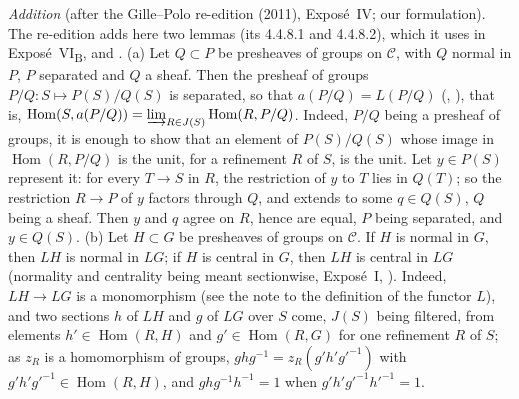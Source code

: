 \par\medskip\noindent
{}\emph{Addition} (after the Gille--Polo re-edition (2011), Expos\'e~IV;
our formulation).  The re-edition adds here two lemmas (its 4.4.8.1 and
4.4.8.2), which it uses in Expos\'e~VI\textsubscript{B},  and .
(a) Let \(Q\subset P\) be presheaves of groups on \(\mathscr C\), with \(Q\)
normal in \(P\), \(P\) separated and \(Q\) a sheaf. Then the presheaf of
groups \(P/Q\colon S\mapsto P(S)/Q(S)\) is separated, so that
\(a(P/Q)=L(P/Q)\) (, ), that is,
\(\operatorname{Hom}(S,a(P/Q))=\varinjlim_{R\in J(S)}\operatorname{Hom}(R,P/Q)\).
Indeed, \(P/Q\) being a presheaf of groups, it is enough to show that an
element of \(P(S)/Q(S)\) whose image in \(\operatorname{Hom}(R,P/Q)\) is the
unit, for a refinement \(R\) of \(S\), is the unit. Let \(y\in P(S)\)
represent it: for every \(T\to S\) in \(R\), the restriction of \(y\) to \(T\)
lies in \(Q(T)\); so the restriction \(R\to P\) of \(y\) factors through
\(Q\), and extends to some \(q\in Q(S)\), \(Q\) being a sheaf. Then \(y\) and
\(q\) agree on \(R\), hence are equal, \(P\) being separated, and
\(y\in Q(S)\).
(b) Let \(H\subset G\) be presheaves of groups on \(\mathscr C\). If
\(H\) is normal in \(G\), then \(LH\) is normal in \(LG\);
if \(H\) is central in \(G\), then \(LH\) is central in \(LG\) (normality and
centrality being meant sectionwise, Expos\'e~I, ). Indeed,
\(LH\to LG\) is a monomorphism (see the note to the definition of the functor
\(L\)), and two sections \(h\) of \(LH\) and \(g\) of \(LG\) over \(S\) come,
\(J(S)\) being filtered, from elements \(h'\in\operatorname{Hom}(R,H)\) and
\(g'\in\operatorname{Hom}(R,G)\) for one refinement \(R\) of \(S\); as \(z_R\)
is a homomorphism of groups, \(ghg^{-1}=z_R(g'h'g'^{-1})\) with
\(g'h'g'^{-1}\in\operatorname{Hom}(R,H)\), and \(ghg^{-1}h^{-1}=1\) when
\(g'h'g'^{-1}h'^{-1}=1\).
\par\medskip
